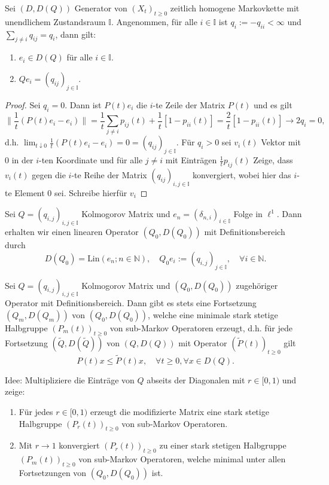 \begin{prop}
  Sei $(D,D(Q))$ Generator von $(X_t)_{t\geq0}$ zeitlich homogene Markovkette mit  unendlichem Zustandsraum $\mathbb I$. Angenommen, für alle $i\in\mathbb I$ ist $q_i:=-q_{ii}< \infty$ und  $\sum_{j\neq i}q_{ij}=q_i$, dann gilt:
  \begin{enumerate}
    \item $e_i\in D(Q)$ für alle $i\in\mathbb I$.
    \item $Qe_i= (q_{ij})_{j\in\mathbb I}$. 
  \end{enumerate}
\end{prop}


\begin{proof}
Sei $q_i=0$. Dann ist $P(t)e_i$ die $i$-te Zeile der Matrix $P(t)$ und es gilt  $$\|\frac{1}{t}(P(t)e_i-e_i)\|=\frac{1}{t}\sum_{j\neq i}p_{ij}(t)+\frac{1}{t}[1-p_{ii}(t)]=\frac{2}{t}[1-p_{ii}(t)]\to 2q_i=0,$$ d.h. $\lim_{t\downarrow 0}\frac{1}{t}(P(t)e_i-e_i)=0=(q_{ij})_{j\in\mathbb I}$. Für $q_i>0$ sei $v_i(t)$ Vektor mit $0$ in der $i$-ten Koordinate und für alle $j\neq i$ mit Einträgen $\frac{1}{t}p_{ij}(t)$ Zeige, dass $v_i(t)$ gegen die $i$-te Reihe der Matrix $(q_{ij})_{i,j\in\mathbb I}$ konvergiert, wobei hier das $i$-te Element $0$ sei. Schreibe hierfür $v_i$
\end{proof}


\begin{konstr}
  Sei $Q=(q_{i,j})_{i,j\in\mathbb I}$ Kolmogorov Matrix und $e_n=(\delta_{n,i})_{i\in\mathbb I}$ Folge in $\ell^1$. Dann erhalten wir einen linearen Operator $(Q_0, D(Q_0))$ mit Definitionsbereich durch $$D(Q_0)=\text{Lin}(e_n;n\in\mathbb N),\quad Q_0e_i:=(q_{i,j})_{j\in\mathbb I},\quad \forall i\in\mathbb N.$$
\end{konstr}



\begin{satz}
  Sei $Q=(q_{i,j})_{i,j\in\mathbb I}$ Kolmogorov Matrix und $(Q_0, D(Q_0))$ zugehöriger Operator mit Definitionsbereich. Dann gibt es stets eine Fortsetzung $(Q_m, D(Q_m))$ von $(Q_0, D(Q_0))$, welche eine minimale stark stetige Halbgruppe $(P_m(t))_{t\geq0}$ von sub-Markov Operatoren erzeugt,  d.h. für jede Fortsetzung $(\tilde Q,D(\tilde Q))$ von $(Q, D(Q))$ mit Operator $(\tilde P(t))_{t\geq0}$ gilt $$P(t)x\leq\tilde P(t)x,\quad \forall t\geq 0,\forall x\in D(Q).$$
\end{satz}

\begin{bem}
  Idee: Multipliziere die Einträge von $Q$ abseits der Diagonalen  mit $r\in [0,1)$ und zeige:
  \begin{enumerate}
      \item Für jedes $r\in[0,1)$ erzeugt die modifizierte Matrix eine stark stetige Halbgruppe $(P_r(t))_{t\geq0}$ von sub-Markov Operatoren.
      \item Mit $r\to 1$ konvergiert $(P_r(t))_{t\geq0}$ zu einer stark stetigen Halbgruppe $(P_m(t))_{t\geq0}$ von sub-Markov Operatoren, welche minimal unter allen Fortsetzungen von $(Q_0, D(Q_0))$ ist.
  \end{enumerate}
\end{bem}

